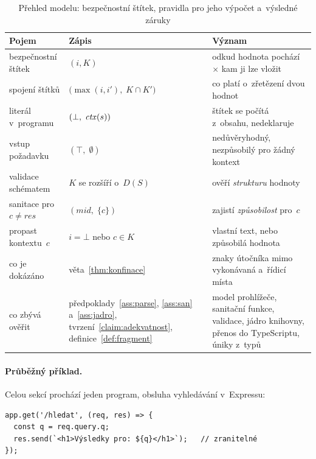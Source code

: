 \begin{table}[htbp]
    \centering
    \footnotesize
    \begin{tabularx}{\textwidth}{@{}lYY@{}}
        \toprule
        \textbf{Pojem} & \textbf{Zápis} & \textbf{Význam} \\
        \midrule
        bezpečnostní štítek & $(i, K)$ & odkud hodnota pochází $\times$ kam ji lze vložit \\
        spojení štítků      & $\bigl(\max(i,i'),\; K \cap K'\bigr)$ & co platí o~zřetězení dvou hodnot \\
        \midrule
        literál v~programu  & $(\bot,\; \mathit{ctx}(s))$ & štítek se počítá z~obsahu, nedeklaruje \\
        vstup požadavku     & $(\top,\; \emptyset)$ & nedůvěryhodný, nezpůsobilý pro žádný kontext \\
        validace schématem  & $K$ se rozšíří o~$D(S)$ & ověří \emph{strukturu} hodnoty \\
        sanitace pro~$c \neq \mathit{res}$ & $(\mathit{mid},\; \{c\})$ & zajistí \emph{způsobilost} pro~$c$ \\
        propast kontextu~$c$ & $i = \bot$ \;nebo\; $c \in K$ & vlastní text, nebo způsobilá hodnota \\
        \midrule
        co je dokázáno      & věta~\ref{thm:konfinace} & znaky útočníka mimo vykonávaná a~řídicí místa \\
        co zbývá ověřit     & předpoklady~\ref{ass:parse}, \ref{ass:san} a~\ref{ass:jadro}, tvrzení~\ref{claim:adekvatnost}, definice~\ref{def:fragment} & model prohlížeče, sanitační funkce, validace, jádro knihovny, přenos do TypeScriptu, úniky z~typů \\
        \bottomrule
    \end{tabularx}
    \caption{Přehled modelu: bezpečnostní štítek, pravidla pro jeho výpočet a~výsledné záruky}
    \label{tab:model-prehled}
\end{table}

\paragraph{Průběžný příklad.}
Celou sekcí prochází jeden program, obsluha vyhledávání v~Expressu:

\begin{verbatim}
app.get('/hledat', (req, res) => {
  const q = req.query.q;
  res.send(`<h1>Výsledky pro: ${q}</h1>`);   // zranitelné
});
\end{verbatim}

